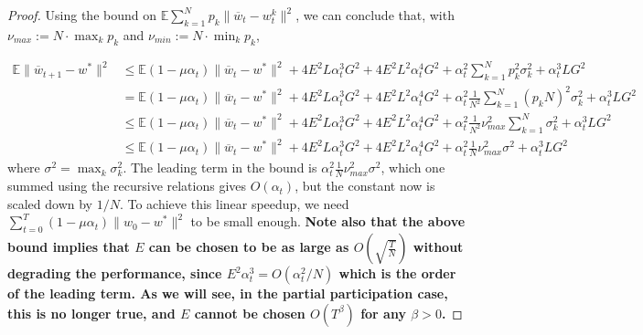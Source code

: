 \begin{proof}
	Using the bound on $\mathbb{E}\sum_{k=1}^{N}p_{k}\|\overline{w}_{t}-w_{t}^{k}\|^{2}$,
	we can conclude that, with $\nu_{max}:=N\cdot\max_{k}p_{k}$ and $\nu_{min}:=N\cdot\min_{k}p_{k}$, 
	
	\begin{align*}
	\mathbb{E}\|\overline{w}_{t+1}-w^{\ast}\|^{2} & \leq\mathbb{E}(1-\mu\alpha_{t})\|\overline{w}_{t}-w^{\ast}\|^{2}+4E^{2}L\alpha_{t}^{3}G^{2}+4E^{2}L^{2}\alpha_{t}^{4}G^{2}+\alpha_{t}^{2}\sum_{k=1}^{N}p_{k}^{2}\sigma_{k}^{2}+\alpha_{t}^{3}LG^{2}\\
	& =\mathbb{E}(1-\mu\alpha_{t})\|\overline{w}_{t}-w^{\ast}\|^{2}+4E^{2}L\alpha_{t}^{3}G^{2}+4E^{2}L^{2}\alpha_{t}^{4}G^{2}+\alpha_{t}^{2}\frac{1}{N^{2}}\sum_{k=1}^{N}(p_{k}N)^{2}\sigma_{k}^{2}+\alpha_{t}^{3}LG^{2}\\
	& \leq\mathbb{E}(1-\mu\alpha_{t})\|\overline{w}_{t}-w^{\ast}\|^{2}+4E^{2}L\alpha_{t}^{3}G^{2}+4E^{2}L^{2}\alpha_{t}^{4}G^{2}+\alpha_{t}^{2}\frac{1}{N^{2}}\nu_{max}^{2}\sum_{k=1}^{N}\sigma_{k}^{2}+\alpha_{t}^{3}LG^{2}\\
	& \leq\mathbb{E}(1-\mu\alpha_{t})\|\overline{w}_{t}-w^{\ast}\|^{2}+4E^{2}L\alpha_{t}^{3}G^{2}+4E^{2}L^{2}\alpha_{t}^{4}G^{2}+\alpha_{t}^{2}\frac{1}{N}\nu_{max}^{2}\sigma^{2}+\alpha_{t}^{3}LG^{2}
	\end{align*}
	where $\sigma^{2}=\max_{k}\sigma_{k}^{2}$. The leading term in the
	bound is $\alpha_{t}^{2}\frac{1}{N}\nu_{max}^{2}\sigma^{2}$, which
	one summed using the recursive relations gives $O(\alpha_{t})$, but
	the constant now is scaled down by $1/N$. To achieve this linear
	speedup, we need $\sum_{t=0}^{T}(1-\mu\alpha_{t})\|w_{0}-w^{\ast}\|^{2}$
	to be small enough. \textbf{Note also that the above bound implies
		that $E$ can be chosen to be as large as $O(\sqrt{\frac{T}{N}})$
		without degrading the performance, since $E^{2}\alpha_{t}^{3}=O(\alpha_{t}^{2}/N)$
		which is the order of the leading term. As we will see, in the partial
		participation case, this is no longer true, and $E$ cannot be chosen
		$O(T^{\beta})$ for any $\beta>0$. }
	

\end{proof}
